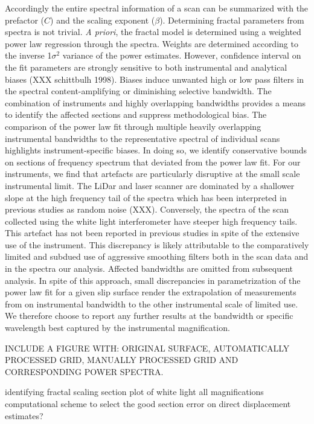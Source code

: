 \documentclass[12pt,a4paper]{article}
\begin{document}
Accordingly the entire spectral information of a scan can be summarized with the prefactor ($C$) and the scaling exponent ($\beta$). Determining fractal parameters from spectra is not trivial. \textit{A priori}, the fractal model is determined using a weighted power law regression through the spectra. Weights are determined according to the inverse 1$\sigma^2$ variance of the power estimates. However, confidence interval on the fit parameters are strongly sensitive to both instrumental and analytical biases (XXX schittbulh 1998). Biases induce unwanted high or low pass filters in the spectral content-amplifying or diminishing selective bandwidth. The combination of instruments and highly overlapping bandwidths provides a means to identify the affected sections and suppress methodological bias. The comparison of the power law fit through multiple heavily overlapping instrumental bandwidths to the representative spectral of individual scans highlights instrument-specific biases. In doing so, we identify conservative bounds on sections of frequency spectrum that deviated from the power law fit. For our instruments, we find that artefacts are particularly disruptive at the small scale instrumental limit. The LiDar and laser scanner are dominated by a shallower slope at the high frequency tail of the spectra which has been interpreted in previous studies as random noise (XXX). Conversely, the spectra of the scan collected using the white light interferometer have steeper high frequency tails. This artefact has not been reported in previous studies in spite of the extensive use of the instrument. This discrepancy is likely attributable to the comparatively limited and subdued use of aggressive smoothing filters both in the scan data and in the spectra our analysis. Affected bandwidths are omitted from subsequent analysis. In spite of this approach, small discrepancies in parametrization of the power law fit for a given slip surface render the extrapolation of measurements from on instrumental bandwidth to the other instrumental scale of limited use. We therefore choose to report any further results at the bandwidth or specific wavelength best captured by the instrumental magnification.
	

INCLUDE A FIGURE WITH: ORIGINAL SURFACE, AUTOMATICALLY PROCESSED GRID, MANUALLY PROCESSED GRID AND CORRESPONDING POWER SPECTRA.


identifying fractal scaling section
	plot of white light all magnifications
	computational scheme to select the good section
error on direct displacement estimates?
\end{document}
